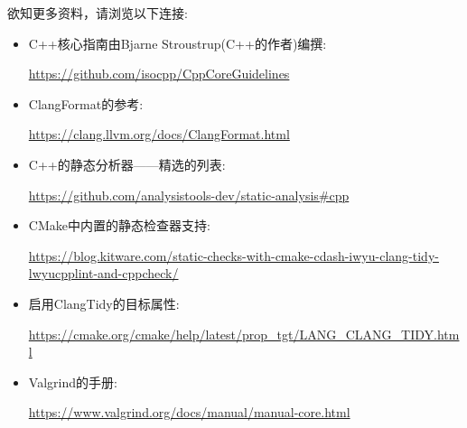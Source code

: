 欲知更多资料，请浏览以下连接:

\begin{itemize}
\item 
C++核心指南由Bjarne Stroustrup(C++的作者)编撰:

\url{https://github.com/isocpp/CppCoreGuidelines}

\item 
ClangFormat的参考:

\url{https://clang.llvm.org/docs/ClangFormat.html}

\item 
C++的静态分析器——精选的列表: 

\url{https://github.com/analysistools-dev/static-analysis\#cpp}

\item 
CMake中内置的静态检查器支持:

\url{https://blog.kitware.com/static-checks-with-cmake-cdash-iwyu-clang-tidy-lwyucpplint-and-cppcheck/}

\item 
启用ClangTidy的目标属性:

\url{https://cmake.org/cmake/help/latest/prop\_tgt/LANG\_CLANG\_TIDY.html}

\item 
Valgrind的手册:

\url{https://www.valgrind.org/docs/manual/manual-core.html}
\end{itemize}